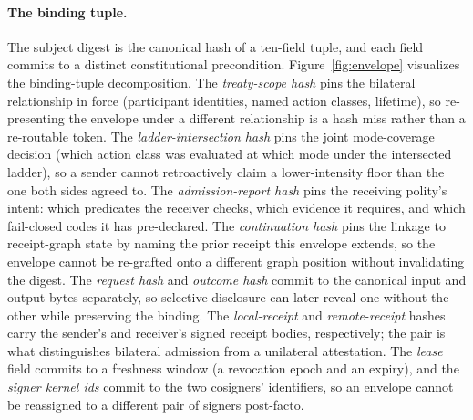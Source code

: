 \paragraph{The binding tuple.} The subject digest is the canonical hash of a ten-field tuple, and each field commits to a distinct constitutional precondition. Figure~\ref{fig:envelope} visualizes the binding-tuple decomposition. The \emph{treaty-scope hash} pins the bilateral relationship in force (participant identities, named action classes, lifetime), so re-presenting the envelope under a different relationship is a hash miss rather than a re-routable token. The \emph{ladder-intersection hash} pins the joint mode-coverage decision (which action class was evaluated at which mode under the intersected ladder), so a sender cannot retroactively claim a lower-intensity floor than the one both sides agreed to. The \emph{admission-report hash} pins the receiving polity's intent: which predicates the receiver checks, which evidence it requires, and which fail-closed codes it has pre-declared. The \emph{continuation hash} pins the linkage to receipt-graph state by naming the prior receipt this envelope extends, so the envelope cannot be re-grafted onto a different graph position without invalidating the digest. The \emph{request hash} and \emph{outcome hash} commit to the canonical input and output bytes separately, so selective disclosure can later reveal one without the other while preserving the binding. The \emph{local-receipt} and \emph{remote-receipt} hashes carry the sender's and receiver's signed receipt bodies, respectively; the pair is what distinguishes bilateral admission from a unilateral attestation. The \emph{lease} field commits to a freshness window (a revocation epoch and an expiry), and the \emph{signer kernel ids} commit to the two cosigners' identifiers, so an envelope cannot be reassigned to a different pair of signers post-facto.

